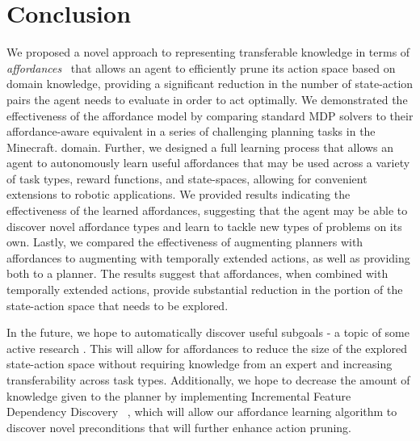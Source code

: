 \documentclass[conference]{IEEEtran}
\begin{document}
\section{Conclusion}
\label{sec:conclusion}

We proposed a novel approach to representing transferable knowledge in terms of
{\em affordances}~\cite{gibson77} that allows an agent to efficiently
prune its action space based on domain knowledge,
providing a significant reduction in the number of state-action pairs the
agent needs to evaluate in order to act optimally. We demonstrated the effectiveness of the affordance model by comparing standard MDP solvers
to their affordance-aware equivalent in a series of challenging planning tasks in the Minecraft.
domain. Further, we designed a full learning process that allows an agent to autonomously learn useful affordances that may be used
across a variety of task types, reward functions, and state-spaces, allowing for convenient extensions to robotic applications.
We provided results indicating the effectiveness of the learned affordances, suggesting that the agent may be able to discover novel affordance types and learn to tackle new types of problems on its own.
Lastly, we compared the effectiveness of augmenting planners with affordances to augmenting with temporally extended actions, as well as providing both to a planner. The results suggest that affordances, when combined with temporally extended actions, provide substantial reduction in the portion of the state-action space that needs to be explored.

In the future, we hope to automatically discover useful subgoals - a topic of some active research \cite{Mcgovern01automaticdiscovery,Simsek:2005:IUS:1102351.1102454}. This will allow for affordances to reduce the size of the explored state-action space without requiring knowledge from an expert and increasing transferability across task types. Additionally, we hope to decrease the amount of knowledge given to the planner by implementing Incremental Feature Dependency Discovery ~\cite{ICML2011Geramifard_473}, which will allow our affordance learning algorithm to discover novel preconditions that will further enhance action pruning.


{\small


}
\end{document}
